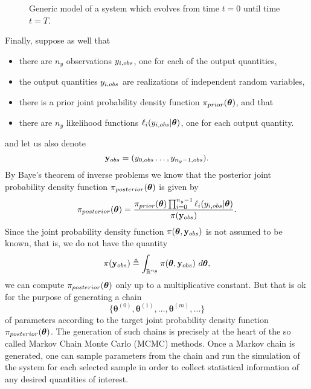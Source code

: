 \begin{figure}
\caption{Generic model of a system which evolves from time $t=0$ until time $t=T$.}\label{fig-model}
\end{figure}

Finally, suppose as well that
\begin{itemize}
\item there are $n_{y}$ observations $y_{i,\tiny{obs}}$, one for each of the output quantities,
\item the output quantities $y_{i,\tiny{obs}}$ are realizations of independent random variables,
\item there is a prior joint probability density function $\pi_{\tiny{prior}}(\boldsymbol\theta)$, and that
\item there are $n_{y}$ likelihood functions $\ell_i(y_{i,\tiny{obs}}|\boldsymbol\theta)$, one for each output quantity.
\end{itemize}
and let us also denote
\begin{equation*}
\mathbf{y}_{\tiny{obs}} = (y_{0,\tiny{obs}}\ldots,y_{n_y-1,\tiny{obs}}).
\end{equation*}
By Baye's theorem of inverse problems \cite{KaSo05} we know that the posterior joint probability density function $\pi_{\tiny{posterior}}(\boldsymbol\theta)$ is given by
\begin{equation}
\pi_{\tiny{posterior}}(\boldsymbol\theta) = \frac{\pi_{\tiny{prior}}(\boldsymbol\theta)\prod_{i=0}^{n_y-1}\ell_i(y_{i,\tiny{obs}}|\boldsymbol\theta)}{\pi(\mathbf{y}_{\tiny{obs}})}.
\end{equation}
Since the joint probability density function $\pi(\boldsymbol\theta,\mathbf{y}_{\tiny{obs}})$ is not assumed to be known, that is, we do not have the quantity
\begin{equation*}
\pi(\mathbf{y}_{\tiny{obs}})\triangleq\int_{\mathbb{R}^{n_\theta}}\pi(\boldsymbol\theta,\mathbf{y}_{\tiny{obs}})~d\boldsymbol{\theta},
\end{equation*}
we can compute $\pi_{\tiny{posterior}}(\boldsymbol\theta)$ only up to a multiplicative constant.
But that is ok for the purpose of generating a chain
\begin{equation}
\{\boldsymbol{\theta}^{(0)},\boldsymbol{\theta}^{(1)},\ldots,\boldsymbol{\theta}^{(m)},\ldots\}
\end{equation}
of parameters according to the target joint probability density function $\pi_{\tiny{posterior}}(\boldsymbol\theta)$.
The generation of such chains is precisely at the heart of the so called Markov Chain Monte Carlo (MCMC) methods.
Once a Markov chain is generated, one can
sample parameters from the chain and
run the simulation of the system for each selected sample in order to
collect statistical information of any desired quantities of interest.

